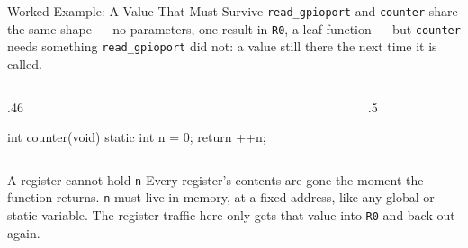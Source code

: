 \documentclass[9pt,aspectratio=169,xcolor=table]{beamer}
\begin{document}
\begin{frame}[fragile]{Worked Example: A Value That Must Survive}
    \leavevmode
    {\small \texttt{read\_gpioport} and \texttt{counter} share the same shape
    --- no parameters, one result in \texttt{R0}, a leaf function --- but
    \texttt{counter} needs something \texttt{read\_gpioport} did not: a value
    still there the \alert{next} time it is called.}

    \vspace{2mm}
    \begin{columns}[T]
    \begin{column}{.46\textwidth}
        \begin{cc}[basicstyle=\normalsize\ttfamily]
int counter(void) {
    static int n = 0;
    return ++n;
}
        \end{cc}
    \end{column}
    \begin{column}{.5\textwidth}
    \end{column}
    \end{columns}

    \vspace{3mm}
\begin{block}{A register cannot hold \texttt{n}} Every register's contents are gone the moment the function returns. \texttt{n} must live in \alert{memory}, at a fixed address, like any global or static variable. The register traffic here only gets that value into \texttt{R0} and back out again. \end{block}
\end{frame}
\end{document}
